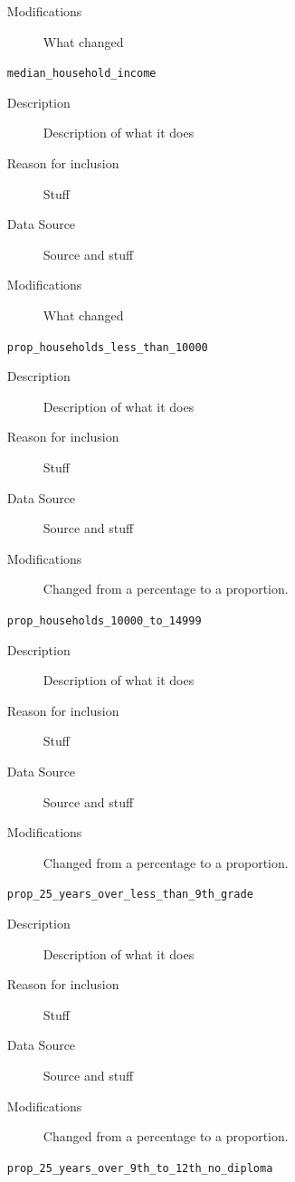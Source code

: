\documentclass{article}
\begin{document}
\begin{itemize}[label={}, align=left]
\begin{description}
		      \item[Modifications] What changed
	      \end{description}
	\item[\texttt{median\_household\_income}] \
	      \begin{description}
		      \item[Description] Description of what it does
		      \item[Reason for inclusion] Stuff
		      \item[Data Source] Source and stuff
		      \item[Modifications] What changed
	      \end{description}
	\item[\texttt{prop\_households\_less\_than\_10000}] \
	      \begin{description}
		      \item[Description] Description of what it does
		      \item[Reason for inclusion] Stuff
		      \item[Data Source] Source and stuff
		      \item[Modifications] Changed from a percentage to a proportion.
	      \end{description}
	\item[\texttt{prop\_households\_10000\_to\_14999}] \
	      \begin{description}
		      \item[Description] Description of what it does
		      \item[Reason for inclusion] Stuff
		      \item[Data Source] Source and stuff
		      \item[Modifications] Changed from a percentage to a proportion.
	      \end{description}
	\item[\texttt{prop\_25\_years\_over\_less\_than\_9th\_grade}] \
	      \begin{description}
		      \item[Description] Description of what it does
		      \item[Reason for inclusion] Stuff
		      \item[Data Source] Source and stuff
		      \item[Modifications] Changed from a percentage to a proportion.
	      \end{description}
	\item[\texttt{prop\_25\_years\_over\_9th\_to\_12th\_no\_diploma}] \

\end{itemize}
\end{document}
